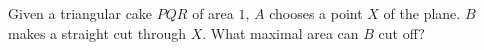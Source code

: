 Given a triangular cake $PQR$ of area $1$, $A$ chooses a point $X$ of the plane. $B$ makes a straight cut through $X$. What maximal area can $B$ cut off?
